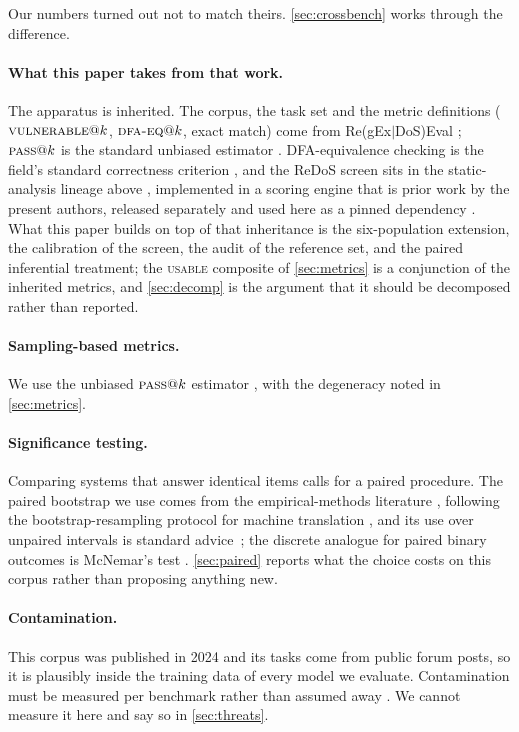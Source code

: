 \documentclass[11pt]{article}
\newcommand{\pass}{\textsc{pass}}
\newcommand{\usable}{\textsc{usable}}
\newcommand{\vuln}{\textsc{vulnerable}}
\newcommand{\dfaeq}{\textsc{dfa-eq}}
\begin{document}
Our numbers turned out not to match theirs. \cref{sec:crossbench} works
through the difference.

\paragraph{What this paper takes from that work.} The apparatus is
inherited. The corpus, the task
set and the metric definitions ($\vuln{}@k$, $\dfaeq{}@k$, exact match) come
from Re(gEx$|$DoS)Eval \citep{siddiq2024regexeval}; $\pass{}@k$ is the
standard unbiased estimator \citep{chen2021codex}. DFA-equivalence checking
is the field's standard correctness criterion \citep{locascio2016neural}, and
the ReDoS screen sits in the static-analysis lineage above
\citep{kirrage2013static,wustholz2017static,sok2025redos}, implemented in a
scoring engine that is prior work by the present authors, released separately
and used here as a pinned dependency \citep{regexbench}. What this paper
builds on top of that inheritance is the six-population extension, the
calibration of the screen, the audit of the reference set, and the paired
inferential treatment; the \usable{} composite of \cref{sec:metrics} is a
conjunction of the inherited metrics, and \cref{sec:decomp} is the argument
that it should be decomposed rather than reported.

\paragraph{Sampling-based metrics.}
We use the unbiased $\pass{}@k$ estimator \citep{chen2021codex}, with the
degeneracy noted in \cref{sec:metrics}.

\paragraph{Significance testing.}
Comparing systems that answer identical items calls for a paired procedure.
The paired bootstrap we use comes from the empirical-methods literature
\citep{bergkirkpatrick2012empirical}, following the bootstrap-resampling
protocol for machine translation \citep{koehn2004bootstrap}, and its use over
unpaired intervals is standard advice~\citep{dror2018hitchhiker}; the
discrete analogue for paired binary outcomes is McNemar's test
\citep{mcnemar1947note}. \cref{sec:paired} reports what the
choice costs on this corpus rather than proposing anything new.

\paragraph{Contamination.}
This corpus was published in 2024 and its tasks come from public forum posts,
so it is plausibly inside the training data of every model we evaluate.
Contamination must be measured per benchmark rather than assumed away
\citep{sainz2023contamination}. We cannot measure it here and say so in
\cref{sec:threats}.
\end{document}

